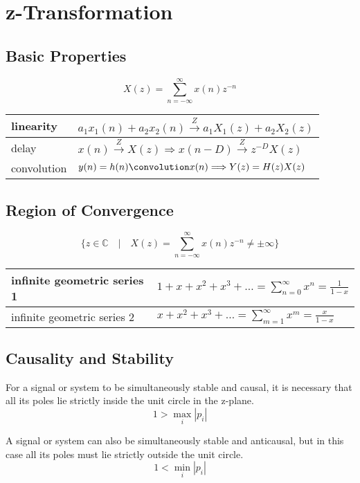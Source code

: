 \section{z-Transformation}

\subsection{Basic Properties}

\[
	X(z) = \sum\limits_{n=-\infty}^\infty x(n)z^{-n}
\]

\begin{tabularx}{0.6\textwidth}{|l|X|}
	\hline
	linearity & $a_1x_1(n) + a_2x_2(n) \overset{Z}{\longrightarrow} a_1X_1(z) + a_2X_2(z)$
	\\ \hline
	delay	& $x(n) \overset{Z}{\longrightarrow} X(z) \Longrightarrow x(n-D) \overset{Z}{\longrightarrow} z^{-D}X(z)$
	\\ \hline
	convolution & $y(n) = h(n) \convolution x(n) \Longrightarrow Y(z) = H(z)X(z)$
	\\ \hline
\end{tabularx}


\subsection{Region of Convergence}

\[
	\{ z \in \mathbb{C} \quad | \quad X(z) = \sum\limits_{n=-\infty}^{\infty} x(n)z^{-n} \neq \pm \infty \}
\]

\begin{tabularx}{0.6\textwidth}{|l|X|}
	\hline
	infinite geometric series 1 & $1 + x + x^2 + x^3 + \ldots = \sum\limits_{n=0}^{\infty} x^n = \frac{1}{1-x}$
	\\ \hline
	infinite geometric series 2 & $x + x^2 + x^3 + \ldots = \sum\limits_{m=1}^{\infty} x^m = \frac{x}{1-x}$
	\\ \hline
\end{tabularx}


\subsection{Causality and Stability}

For a signal or system to be simultaneously stable and causal, it is necessary that all its poles lie strictly inside the unit circle in the z-plane. 
\[ 1 > \max\limits_{i}|p_i| \]

A signal or system
can also be simultaneously stable and anticausal, but in this case all its poles must lie
strictly outside the unit circle.
\[ 1 < \min\limits_{i}|p_i| \]

